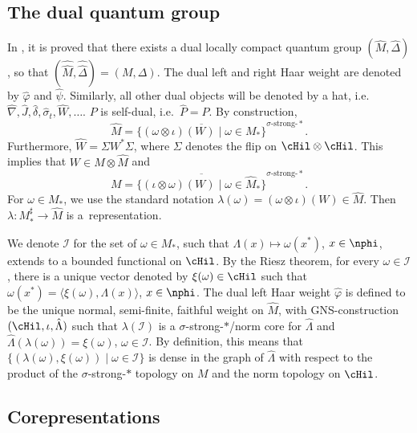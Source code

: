 \subsection*{The dual quantum group}
In \cite{KusVae, KusVaeII}, it is
proved that there exists a dual locally compact quantum group
$(\hat{M},\hat{\Delta})$, so that
$(\hat{\hat{M}},\hat{\hat{\Delta}}) = (M,\Delta)$. The dual left
and right Haar weight are denoted by $\hat{\varphi}$ and
$\hat{\psi}$. Similarly, all other dual objects will be denoted by
a hat, i.e.\ $\hat{\nabla}, \hat{J}, \hat{\delta}, \hat{\sigma}_t, \hat{W}, \ldots$.  $P$ is self-dual, i.e.\ $\hat{P} = P$. By construction,
\[\hat{M} = \overline{\big\{ (\omega
\otimes \iota)(W) \mid \omega \in M_\ast
\big\}}^{\sigma\text{-strong-}\ast}.
\] Furthermore, $\hat{W} =
\Sigma W^\ast \Sigma$, where $\Sigma$ denotes the f\/lip on $\cHil
\otimes \cHil$. This implies that $W \in M \otimes \hat{M}$ and
\[
M = \overline{\big\{ (\iota \otimes \omega)(W) \mid \omega \in
\hat{M}_\ast \big\}}^{\sigma\text{-strong-}\ast}.
\]
 For $\omega \in
M_\ast$, we use the standard notation $\lambda(\omega) = (\omega
\otimes \iota) (W) \in \hat{M}$. Then $\lambda: M_\ast^\sharp \rightarrow \hat{M}$ is a~representation.

 We denote $\mathcal{I}$ for the set of
$\omega \in M_\ast$, such that $\Lambda(x) \mapsto \omega(x^\ast)$,
$x \in \nphi$, extends to a bounded functional on $\cHil$. By the
Riesz theorem, for every $\omega \in \mathcal{I}$, there is a
unique vector denoted by $\xi(\omega) \in \cHil$ such that
$\omega(x^\ast) = \langle \xi(\omega)  , \Lambda(x) \rangle$, $x \in
\nphi$. The dual left Haar weight $\hat{\varphi}$ is def\/ined to be
the unique normal, semi-f\/inite, faithful weight on $\hat{M}$, with
GNS-construction $(\cHil, \iota, \hat{\Lambda})$ such that
$\lambda(\mathcal{I})$ is a $\sigma$-strong-$\ast$/norm core for
$\hat{\Lambda}$ and $\hat{\Lambda}(\lambda(\omega)) = \xi(\omega)$,
$\omega \in \mathcal{I}$. By def\/inition, this means that $\{ (\lambda(\omega), \xi(\omega)) \mid \omega \in \mathcal{I} \}$ is dense in the graph of $\hat{\Lambda}$ with respect to the product of the $\sigma$-strong-$\ast$ topology on $M$ and the norm topology on $\cHil$.

\subsection*{Corepresentations}

